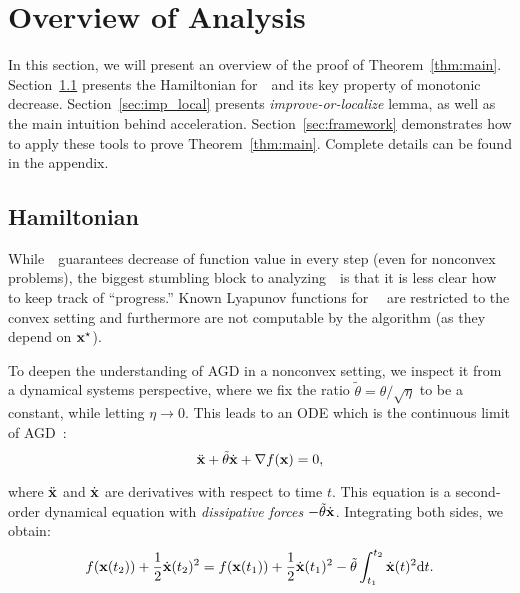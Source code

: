
\section{Overview of Analysis}
In this section, we will present an overview of the proof of Theorem~\ref{thm:main}. Section~\ref{sec:hamiltonian} presents the Hamiltonian for~\nag~and its key property of monotonic decrease. Section~\ref{sec:imp_local} presents \emph{improve-or-localize} lemma, as well as the main intuition behind acceleration. Section~\ref{sec:framework} demonstrates how to apply these tools to prove Theorem~\ref{thm:main}.
Complete details can be found in the appendix.

\subsection{Hamiltonian}\label{sec:hamiltonian}
While~\gd~guarantees decrease of function value in every step (even for nonconvex problems), the biggest stumbling block to analyzing~\nag~is that it is less clear
how to keep track of ``progress.'' Known Lyapunov functions 
for~\nag~\citep{wilson2016lyapunov} are restricted to the convex setting and furthermore are not computable by the algorithm (as they depend on $\mathbf{x}^\star$). %

To deepen the understanding of AGD in a nonconvex setting, we inspect it from a dynamical
systems perspective, where we fix the ratio $\tilde{\theta} = \theta / \sqrt{\eta}$ to be a 
constant, while letting $\eta \rightarrow 0$. This leads to an ODE which is the continuous 
limit of AGD~\citep{su2016differential}:
\vspace{-0.15cm}
\begin{equation}\label{eq:ODE}
\ddot{\mathbf{x}} + \tilde{\theta}\dot{\mathbf{x}} + \nabla f(\mathbf{x}) = 0,
\end{equation}
\vspace{-0.5cm}

\noindent where $\ddot{\mathbf{x}}$ and $\dot{\mathbf{x}}$ are derivatives with respect to time $t$. 
This equation is a second-order dynamical equation with \emph{dissipative forces} 
$-\tilde{\theta}\dot{\mathbf{x}}$. Integrating both sides, we obtain:
\vspace{-0.15cm}
\begin{equation}
f(\mathbf{x}(t_2)) + \frac{1}{2}\dot{\mathbf{x}}(t_2)^2 = f(\mathbf{x}(t_1)) + \frac{1}{2}\dot{\mathbf{x}}(t_1)^2 - \tilde{\theta}\int_{t_1}^{t_2}\dot{\mathbf{x}}(t)^2\mathrm{d}t.
\label{eq:energy_ODE}
\end{equation}
\vspace{-0.5cm}


